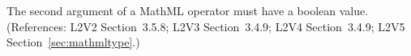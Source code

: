 The second argument of a MathML  operator must have
a boolean value.  (References: L2V2 Section~3.5.8; L2V3 Section~3.4.9; L2V4 Section~3.4.9; L2V5 Section~\ref{sec:mathmltype}.)
